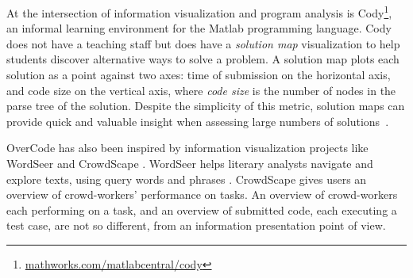 At the intersection of information visualization and program analysis is Cody\footnote{\url{mathworks.com/matlabcentral/cody}}, an informal learning environment for the Matlab programming language. Cody does not have a teaching staff but does have a {\em solution map} visualization to help students discover alternative ways to solve a problem. A solution map plots each solution as a point against two axes: time of submission on the horizontal axis, and code size on the vertical axis, where \textit{code size} is the number of nodes in the parse tree of the solution. Despite the simplicity of this metric, solution maps can provide quick and valuable insight when assessing large numbers of solutions~\cite{ICERGlassman}.


OverCode has also been inspired by information visualization projects like WordSeer \cite{wordseerlitcomp13,wordseercikm13} and CrowdScape \cite{crowdscape}. WordSeer helps literary analysts navigate and explore texts, using query words and phrases \cite{wordseerhcir11}. CrowdScape gives users an overview of crowd-workers’ performance on tasks. An overview of crowd-workers each performing on a task, and an overview of submitted code, each executing a test case, are not so different, from an information presentation point of view.